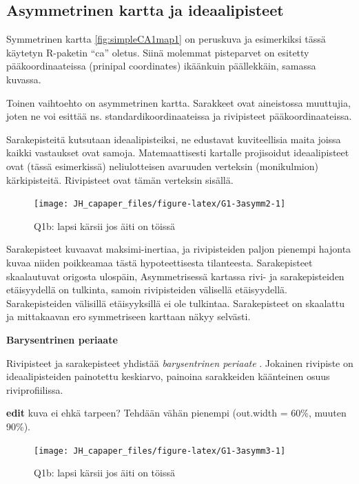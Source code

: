 \documentclass[
  finnish,
]{book}
\begin{document}
\hypertarget{asymmetrinen-kartta-ja-ideaalipisteet}{%
\subsection{Asymmetrinen kartta ja ideaalipisteet}\label{asymmetrinen-kartta-ja-ideaalipisteet}}

Symmetrinen kartta \ref{fig:simpleCA1map1} on peruskuva ja esimerkiksi tässä
käytetyn R-paketin ``ca'' oletus. Siinä molemmat pisteparvet on esitetty
pääkoordinaateissa (prinipal coordinates) ikäänkuin päällekkäin, samassa kuvassa.

Toinen vaihtoehto on asymmetrinen kartta. Sarakkeet ovat aineistossa muuttujia,
joten ne voi esittää ns. standardikoordinaateissa ja rivipisteet pääkoordinaateissa.

Sarakepisteitä kutsutaan ideaalipisteiksi, ne edustavat kuviteellisia maita joissa
kaikki vastaukset ovat samoja. Matemaattisesti kartalle projisoidut ideaalipisteet
ovat (tässä esimerkissä) neliulotteisen avaruuden verteksin (monikulmion)
kärkipisteitä. Rivipisteet ovat tämän verteksin sisällä.

\begin{figure}

{\centering \texttt{[image: JH\_capaper\_files/figure-latex/G1-3asymm2-1]} 

}

\caption{Q1b: lapsi kärsii jos äiti on töissä}\label{fig:G1-3asymm2}
\end{figure}

Sarakepisteet kuvaavat maksimi-inertiaa, ja rivipisteiden paljon pienempi hajonta
kuvaa niiden poikkeamaa tästä hypoteettisesta tilanteesta. Sarakepisteet
skaalautuvat origosta ulospäin, Asymmetrisessä kartassa rivi- ja sarakepisteiden
etäisyydellä on tulkinta, samoin rivipisteiden välisellä etäisyydellä.
Sarakepisteiden välisillä etäisyyksillä ei ole tulkintaa. Sarakepisteet on
skaalattu ja mittakaavan ero symmetriseen karttaan näkyy selvästi.

\textbf{Barysentrinen periaate}

Rivipisteet ja sarakepisteet yhdistää \emph{barysentrinen periaate} . Jokainen rivipiste
on ideaalipisteiden painotettu keskiarvo, painoina sarakkeiden käänteinen osuus
riviprofiilissa.

\textbf{edit} kuva ei ehkä tarpeen? Tehdään vähän pienempi (out.width = 60\%, muuten 90\%).

\begin{figure}

{\centering \texttt{[image: JH\_capaper\_files/figure-latex/G1-3asymm3-1]} 

}

\caption{Q1b: lapsi kärsii jos äiti on töissä}\label{fig:G1-3asymm3}
\end{figure}
\end{document}

